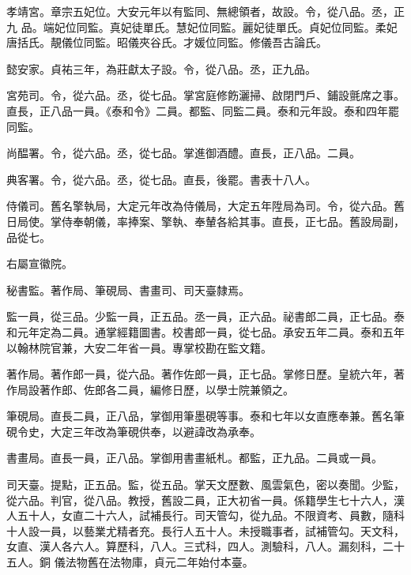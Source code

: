 \begin{pinyinscope}
 孝靖宮。章宗五妃位。大安元年以有監同、無總領者，故設。令，從八品。丞，正九
 品。端妃位同監。真妃徒單氏。慧妃位同監。麗妃徒單氏。貞妃位同監。柔妃唐括氏。靚儀位同監。昭儀夾谷氏。才媛位同監。修儀吾古論氏。



 懿安家。貞祐三年，為莊獻太子設。令，從八品。丞，正九品。



 宮苑司。令，從六品。丞，從七品。掌宮庭修飭灑掃、啟閉門戶、鋪設氈席之事。直長，正八品一員。《泰和令》二員。都監、同監二員。泰和元年設。泰和四年罷同監。



 尚醖署。令，從六品。丞，從七品。掌進御酒醴。直長，正八品。二員。



 典客署。令，從六品。丞，從七品。直長，後罷。書表十八人。



 侍儀司。舊名擎執局，大定元年改為侍儀局，大定五年陞局為司。令，從六品。舊日局使。掌侍奉朝儀，率捧案、擎執、奉輦各給其事。直長，正七品。舊設局副，品從七。



 右屬宣徽院。



 秘書監。著作局、筆硯局、書畫司、司天臺隸焉。



 監一員，從三品。少監一員，正五品。丞一員，正六品。祕書郎二員，正七品。泰和元年定為二員。通掌經籍圖書。校書郎一員，從七品。承安五年二員。泰和五年以翰林院官兼，大安二年省一員。專掌校勘在監文籍。



 著作局。著作郎一員，從六品。著作佐郎一員，正七品。掌修日歷。皇統六年，著作局設著作郎、佐郎各二員，編修日歷，以學士院兼領之。



 筆硯局。直長二員，正八品，掌御用筆墨硯等事。泰和七年以女直應奉兼。舊名筆硯令史，大定三年改為筆硯供奉，以避諱改為承奉。



 書畫局。直長一員，正八品。掌御用書畫紙札。都監，正九品。二員或一員。



 司天臺。提點，正五品。監，從五品。掌天文歷數、風雲氣色，密以奏聞。少監，從六品。判官，從八品。教授，舊設二員，正大初省一員。係籍學生七十六人，漢人五十人，女直二十六人，試補長行。司天管勾，從九品。不限資考、員數，隨科十人設一員，以藝業尤精者充。長行人五十人。未授職事者，試補管勾。天文科，女直、漢人各六人。算歷科，八人。三式科，四人。測驗科，八人。漏刻科，二十五人。銅
 儀法物舊在法物庫，貞元二年始付本臺。




\end{pinyinscope}
